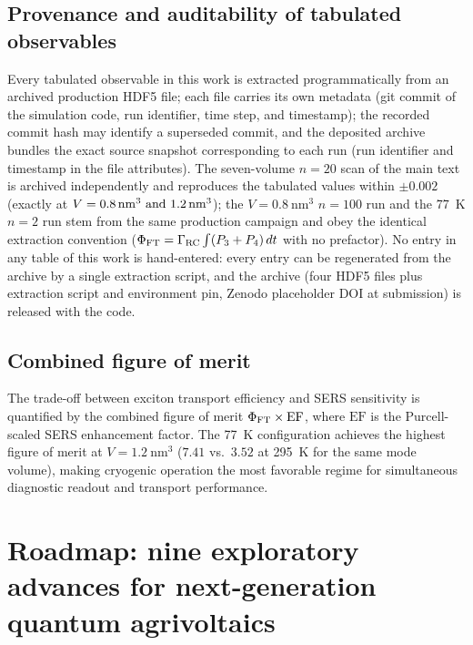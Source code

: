 \documentclass[11pt,a4paper]{article}
\begin{document}
\subsection{Provenance and auditability of tabulated observables}

Every tabulated observable in this work is extracted programmatically from an archived production HDF5 file; each file carries its own metadata (git commit of the simulation code, run identifier, time step, and timestamp); the recorded commit hash may identify a superseded commit, and the deposited archive bundles the exact source snapshot corresponding to each run (run identifier and timestamp in the file attributes). The seven-volume $n=20$ scan of the main text is archived independently and reproduces the tabulated values within $\pm 0.002$ (exactly at $V = \qtylist{0.8;1.2}{\nm\cubed}$); the $V = \qty{0.8}{\nm\cubed}$ $n=100$ run and the \qty{77}{\kelvin} $n=2$ run stem from the same production campaign and obey the identical extraction convention ($\Phi_{\rm FT} = \Gamma_{\rm RC} \int (P_3 + P_4)\,dt$ with no prefactor). No entry in any table of this work is hand-entered: every entry can be regenerated from the archive by a single extraction script, and the archive (four HDF5 files plus extraction script and environment pin, Zenodo placeholder DOI at submission) is released with the code.

\subsection{Combined figure of merit}

The trade-off between exciton transport efficiency and SERS sensitivity is quantified by the combined figure of merit $\Phi_{\rm FT} \times \mathrm{EF}$, where $\mathrm{EF}$ is the Purcell-scaled SERS enhancement factor. The \qty{77}{\kelvin} configuration achieves the highest figure of merit at $V = \qty{1.2}{\nm\cubed}$ ($7.41$ vs.~$3.52$ at \qty{295}{\kelvin} for the same mode volume), making cryogenic operation the most favorable regime for simultaneous diagnostic readout and transport performance.



\section{Roadmap: nine exploratory advances for next-generation quantum agrivoltaics}
\label{SI-sec:roadmap}
\end{document}
